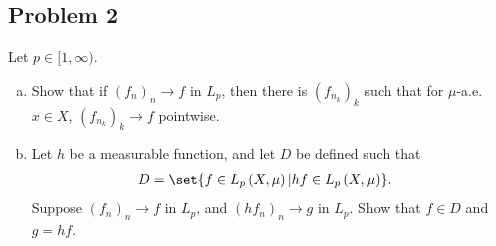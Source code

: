 \documentclass[10pt]{mypackage}
\begin{document}
\subsection{Problem 2}%
\begin{problem}
  Let $p\in [1,\infty)$.
  \begin{enumerate}[(a)]
    \item Show that if $\left( f_n \right)_n\rightarrow f$ in $L_p$, then there is $\left( f_{n_k} \right)_k$ such that for $\mu$-a.e. $x\in X$, $\left( f_{n_k} \right)_k\rightarrow f$ pointwise.
    \item Let $h$ be a measurable function, and let $D$ be defined such that
      \begin{align*}
        D &= \set{f\in L_p\left( X,\mu \right) | hf\in L_p\left( X,\mu \right)}.
      \end{align*}
      Suppose $\left( f_n \right)_n\rightarrow f$ in $L_p$, and $\left( hf_n \right)_n\rightarrow g$ in $L_p$. Show that $f\in D$ and $g = hf$.
  \end{enumerate}
\end{problem}
\end{document}
